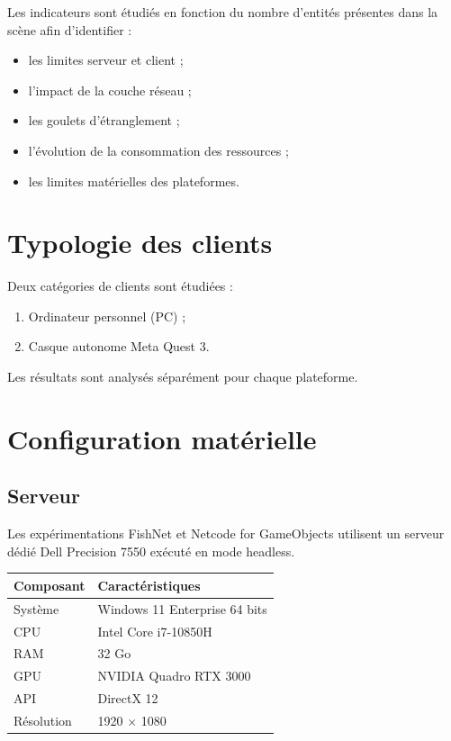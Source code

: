 \documentclass[11pt,a4paper]{article}
\begin{document}
Les indicateurs sont étudiés en fonction du nombre d'entités présentes dans la scène afin d'identifier :

\begin{itemize}
\item les limites serveur et client ;
\item l'impact de la couche réseau ;
\item les goulets d'étranglement ;
\item l'évolution de la consommation des ressources ;
\item les limites matérielles des plateformes.
\end{itemize}

\section{Typologie des clients}

Deux catégories de clients sont étudiées :

\begin{enumerate}
\item Ordinateur personnel (PC) ;
\item Casque autonome Meta Quest 3.
\end{enumerate}

Les résultats sont analysés séparément pour chaque plateforme.

\section{Configuration matérielle}

\subsection{Serveur}

Les expérimentations FishNet et Netcode for GameObjects utilisent un serveur dédié Dell Precision 7550 exécuté en mode headless.

\begin{longtable}{ll}
\toprule
Composant & Caractéristiques \\
\midrule
Système & Windows 11 Enterprise 64 bits \\
CPU & Intel Core i7-10850H \\
RAM & 32 Go \\
GPU & NVIDIA Quadro RTX 3000 \\
API & DirectX 12 \\
Résolution & 1920 $\times$ 1080 \\
\bottomrule
\end{longtable}
\end{document}
